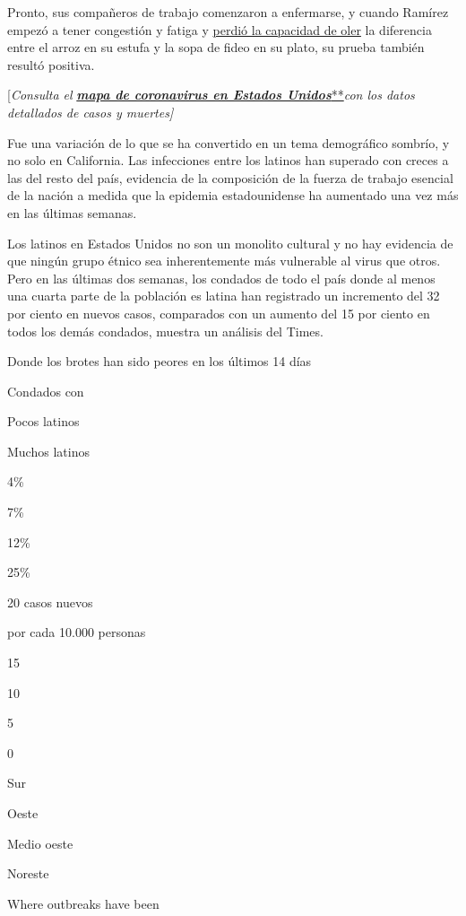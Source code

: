 Pronto, sus compañeros de trabajo comenzaron a enfermarse, y cuando
Ramírez empezó a tener congestión y fatiga y
\href{https://www.nytimes3xbfgragh.onion/2020/03/22/health/coronavirus-symptoms-smell-taste.html}{perdió
la capacidad de oler} la diferencia entre el arroz en su estufa y la
sopa de fideo en su plato, su prueba también resultó positiva.

{[}\emph{Consulta el}
\textbf{\href{https://www.nytimes3xbfgragh.onion/es/interactive/2020/espanol/mundo/coronavirus-en-estados-unidos.html}{\emph{mapa
de coronavirus en Estados
Unidos}}}\href{https://www.nytimes3xbfgragh.onion/es/interactive/2020/espanol/mundo/coronavirus-en-estados-unidos.html}{**}\emph{con
los datos detallados de casos y muertes{]}}

Fue una variación de lo que se ha convertido en un tema demográfico
sombrío, y no solo en California. Las infecciones entre los latinos han
superado con creces a las del resto del país, evidencia de la
composición de la fuerza de trabajo esencial de la nación a medida que
la epidemia estadounidense ha aumentado una vez más en las últimas
semanas.

Los latinos en Estados Unidos no son un monolito cultural y no hay
evidencia de que ningún grupo étnico sea inherentemente más vulnerable
al virus que otros. Pero en las últimas dos semanas, los condados de
todo el país donde al menos una cuarta parte de la población es latina
han registrado un incremento del 32 por ciento en nuevos casos,
comparados con un aumento del 15 por ciento en todos los demás condados,
muestra un análisis del Times.

Donde los brotes han sido peores en los últimos 14 días

Condados con

Pocos latinos

Muchos latinos

4\%

7\%

12\%

25\%

20 casos nuevos

por cada 10.000 personas

15

10

5

0

Sur

Oeste

Medio oeste

Noreste

Where outbreaks have been

